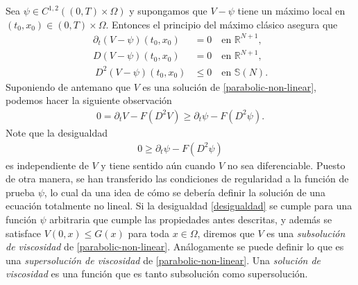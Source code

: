 \documentclass{article}
\numberwithin{equation}{section}
\begin{document}
Sea $\psi \in C^{1,2}((0,T)\times\Omega)$ y supongamos que $V-\psi$ tiene un máximo local en $(t_0,x_0) \in (0,T)\times \Omega$. Entonces el principio del máximo clásico asegura que
\begin{align*}
    \partial_t(V-\psi)(t_0,x_0) &= 0 \quad \text{en } \mathbb{R}^{N+1}, \\
    D(V-\psi)(t_0,x_0) &= 0 \quad \text{en }\mathbb{R}^{N+1}, \\\
    D^2(V-\psi)(t_0,x_0) &\leq 0 \quad \text{en } \mathbb{S}(N).
\end{align*}
Suponiendo de antemano que $V$ es una solución de \eqref{parabolic-non-linear}, podemos hacer la siguiente observación
\begin{align*}
    0 = \partial_tV - F(D^2V) \geq \partial_t\psi - F(D^2\psi).
\end{align*}
Note que la desigualdad 
\begin{align}\label{desigualdad}
0 \geq \partial_t\psi - F(D^2\psi)
\end{align}
es independiente de $V$ y tiene sentido aún cuando $V$ no sea diferenciable. Puesto de otra manera, se han transferido las condiciones de regularidad a la función de prueba $\psi$, lo cual da una idea de cómo se debería definir la solución de una ecuación totalmente no lineal.  Si la desigualdad \eqref{desigualdad} se cumple para una función $\psi$ arbitraria que cumple las propiedades antes descritas, y además se satisface $V(0,x) \leq G(x)$ para toda $x \in \Omega$, diremos que $V$ es una \emph{subsolución de viscosidad} de \eqref{parabolic-non-linear}. Análogamente se puede definir lo que es una \emph{supersolución de viscosidad} de \eqref{parabolic-non-linear}. Una \emph{solución de viscosidad} es una función que es tanto subsolución como supersolución. 
\end{document}
